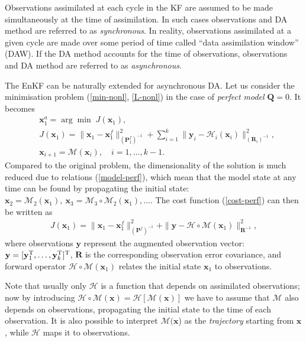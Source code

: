 \documentclass[11pt]{report}
\newcommand{\mb} {\mathbf}
\newcommand{\T}{^{\tiny \mathrm T}}
\begin{document}
Observations assimilated at each cycle in the KF are assumed to be made simultaneously at the time of assimilation.
In such cases observations and DA method are referred to as \emph{synchronous}.
In reality, observations assimilated at a given cycle are made over some period of time called ``data assimilation window'' (DAW).
If the DA method accounts for the time of observations, observations and DA method are referred to as \emph{asynchronous}.

The EnKF can be naturally extended for asynchronous DA.
Let us consider the minimisation problem (\ref{min-nonl}, \ref{L-nonl}) in the case of \emph{perfect model} $\mb Q = 0$.
It becomes
\begin{align}
  \label{min-perf}
  &{\mb x_1^a} = \arg \min \; J(\mb x_1),\\
  \label{cost-perf}
  &J(\mb x_1)  = \|\mb x_1 - \mb x_1^f\|^2_{(\mb P_1^f)^{-1}} + \sum_{i = 1}^k \|\mb y_i - \mathcal H_i(\mb x_i)\|^2_{(\mb R_i)^{-1}},\\
  \label{model-perf}
  &\mb x_{i+1} = \mathcal M(\mb x_i),\quad i = 1,\dots,k-1.
\end{align}
Compared to the original problem, the dimensionality of the solution is much reduced due to relations (\ref{model-perf}), which mean that the model state at any time can be found by propagating the initial state: $\mb x_2 = \mathcal M_2(\mb x_1),\ \mb x_3 = \mathcal M_3 \circ \mathcal M_2(\mb x_1), \dots$.
The cost function (\ref{cost-perf}) can then be written as
\begin{align}
  \label{cost-async}
  J(\mb x_1)  = \|\mb x_1 - \mb x_1^f\|^2_{(\mb P^f)^{-1}} + \|\mb y - \mathcal H \circ \mathcal M(\mb x_1)\|^2_{\mb R^{-1}},
\end{align}
where observations $\mb y$ represent the augmented observation vector: $\mb y = [\mb y_1\T,\dots,\mb y_k\T]\T$, $\mb R$ is the corresponding observation error covariance, and forward operator $\mathcal H \circ \mathcal M (\mb x_1)$ relates the initial state $\mb x_1$ to observations.

Note that usually only $\mathcal H$ is a function that depends on assimilated observations; now by introducing $\mathcal H \circ \mathcal M (\mb x) = \mathcal H[\mathcal M(\mb x)]$ we have to assume that $\mathcal M$ also depends on observations, propagating the initial state to the time of each observation.
It is also possible to interpret $\mathcal M(\mb x$) as the \emph{trajectory} starting from $\mb x$, while $\mathcal H$ maps it to observations.
\end{document}
